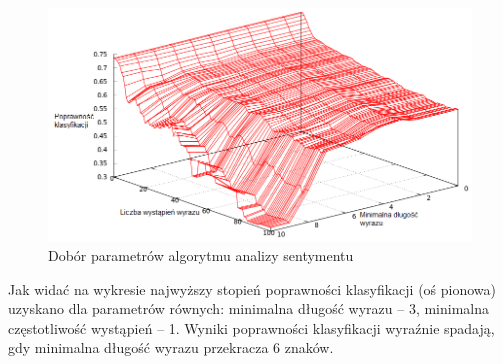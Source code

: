\begin{figure}[ht!]
\centering
\includegraphics[width=160mm]{img/pak-paroubek-params_pl.png}
\caption{Dobór parametrów algorytmu analizy sentymentu}
\label{image:pak-paroubek-parametry}
\end{figure}

Jak widać na wykresie  
najwyższy stopień poprawności klasyfikacji (oś pionowa) uzyskano dla parametrów
równych: minimalna długość wyrazu -- 3, minimalna częstotliwość wystąpień -- 1.
Wyniki poprawności klasyfikacji wyraźnie spadają, gdy minimalna długość wyrazu
przekracza 6 znaków.
